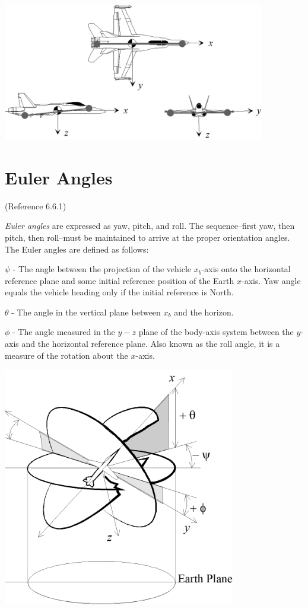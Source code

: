 \documentclass[
]{book}
\providecommand{\tightlist}{%
  \setlength{\itemsep}{0pt}\setlength{\parskip}{0pt}}
\begin{document}
\includegraphics[width=4.5in,height=2.375in]{media/06/image11.png}

\hypertarget{euler-angles}{%
\section{Euler Angles}\label{euler-angles}}

(Reference 6.6.1)

\emph{Euler angles} are expressed as yaw, pitch, and roll. The sequence--first yaw, then pitch, then roll--must be maintained to arrive at the proper orientation angles. The Euler angles are defined as follows:

\begin{description}
\tightlist
\item[Yaw Angle]
\(\psi\) - The angle between the projection of the vehicle \(x_b\)-axis onto the horizontal reference plane and some initial reference position of the Earth \(x\)-axis. Yaw angle equals the vehicle heading only if the initial reference is North.
\item[Pitch Angle]
\(\theta\) - The angle in the vertical plane between \(x_b\) and the horizon.
\item[Bank Angle]
\(\phi\) - The angle measured in the \(y-z\) plane of the body-axis system between the \(y\)-axis and the horizontal reference plane. Also known as the roll angle, it is a measure of the rotation about the \(x\)-axis.
\end{description}

\includegraphics[width=4in,height=4.125in]{media/06/image12.png}
\end{document}
